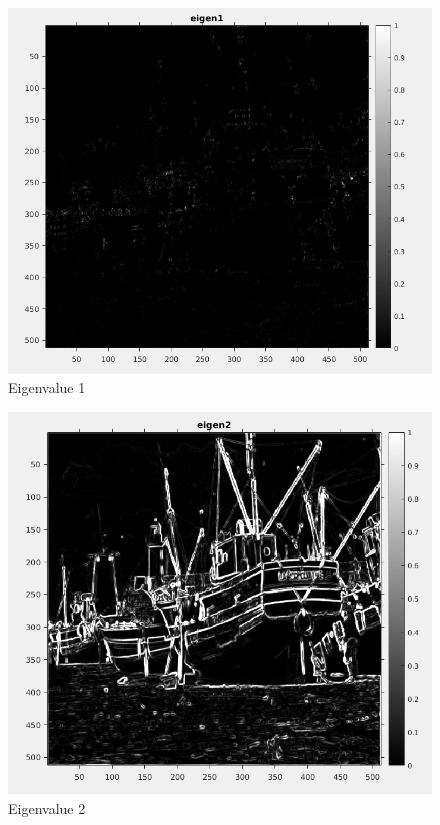 \documentclass{article}
\begin{document}
\newpage


\begin{figure}[h!]
  \includegraphics[width=\linewidth]{eigen1.png}
  \caption{Eigenvalue 1}
  \label{fig:result2}
\end{figure}

\newpage


\begin{figure}[h!]
  \includegraphics[width=\linewidth]{eigen2.png}
  \caption{Eigenvalue 2}
  \label{fig:result2}
\end{figure}
\end{document}
